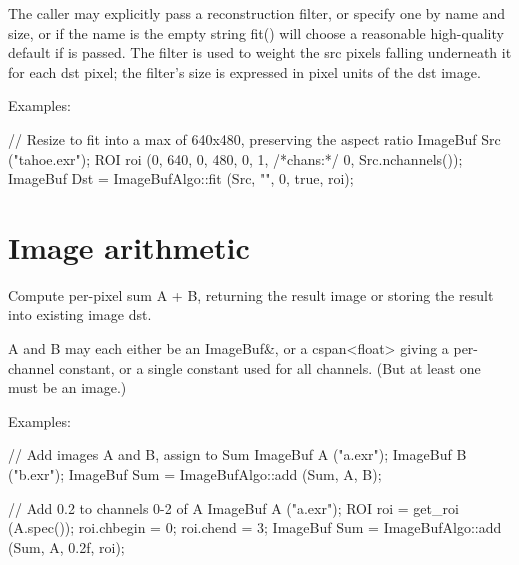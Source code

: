 The caller may explicitly pass a reconstruction filter, or specify one by
name and size, or if the name is the empty string {\cf fit()} will choose
a reasonable high-quality default if \NULL is passed.  The filter is used to
weight the {\cf src} pixels falling underneath it for each {\cf dst} pixel;
the filter's size is expressed in pixel units of the {\cf dst} image.

\smallskip
\noindent Examples:
\begin{code}
    // Resize to fit into a max of 640x480, preserving the aspect ratio
    ImageBuf Src ("tahoe.exr");
    ROI roi (0, 640, 0, 480, 0, 1, /*chans:*/ 0, Src.nchannels());
    ImageBuf Dst = ImageBufAlgo::fit (Src, "", 0, true, roi);
\end{code}
\apiend




\section{Image arithmetic}
\label{sec:iba:arith}

 

Compute per-pixel sum {\cf A + B}, returning the result image or storing
the result into existing image {\cf dst}.

{\cf A} and {\cf B} may each either be an {\cf ImageBuf\&}, or a
{\cf cspan<float>} giving a per-channel constant, or a single constant used
for all channels. (But at least one must be an image.)

\smallskip
\noindent Examples:
\begin{code}
    // Add images A and B, assign to Sum
    ImageBuf A ("a.exr");
    ImageBuf B ("b.exr");
    ImageBuf Sum = ImageBufAlgo::add (Sum, A, B);

    // Add 0.2 to channels 0-2 of A
    ImageBuf A ("a.exr");
    ROI roi = get_roi (A.spec());
    roi.chbegin = 0;  roi.chend = 3;
    ImageBuf Sum = ImageBufAlgo::add (Sum, A, 0.2f, roi);
\end{code}
\apiend



 

